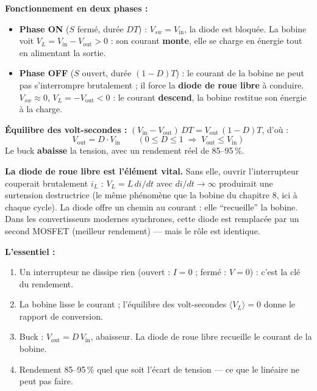 \documentclass[12pt,a4paper,twoside]{book}
\begin{document}
\begin{formule}
\textbf{Fonctionnement en deux phases :}
\begin{itemize}[nosep]
\item \textbf{Phase ON} ($S$ fermé, durée $DT$) : $V_{sw} = V_{\text{in}}$, la diode est bloquée. La bobine voit $V_L = V_{\text{in}} - V_{\text{out}} > 0$ : son courant \textbf{monte}, elle se charge en énergie tout en alimentant la sortie.
\item \textbf{Phase OFF} ($S$ ouvert, durée $(1-D)T$) : le courant de la bobine ne peut pas s'interrompre brutalement ; il force la \textbf{diode de roue libre} à conduire. $V_{sw} \approx 0$, $V_L = -V_{\text{out}} < 0$ : le courant \textbf{descend}, la bobine restitue son énergie à la charge.
\end{itemize}

\textbf{Équilibre des volt-secondes :} $(V_{\text{in}} - V_{\text{out}})\,DT = V_{\text{out}}\,(1-D)T$, d'où :
\[
\boxed{V_{\text{out}} = D \cdot V_{\text{in}} \qquad (0 \leq D \leq 1 \;\Rightarrow\; V_{\text{out}} \leq V_{\text{in}})}
\]
Le buck \textbf{abaisse} la tension, avec un rendement réel de 85--95\,\%.
\end{formule}

\begin{intuition}
\textbf{La diode de roue libre est l'élément vital.} Sans elle, ouvrir l'interrupteur couperait brutalement $i_L$ : $V_L = L\,di/dt$ avec $di/dt \to \infty$ produirait une surtension destructrice (le même phénomène que la bobine du chapitre 8, ici à chaque cycle). La diode offre un chemin au courant : elle ``recueille'' la bobine. Dans les convertisseurs modernes synchrones, cette diode est remplacée par un second MOSFET (meilleur rendement) --- mais le rôle est identique.
\end{intuition}

\begin{retenir}
\textbf{L'essentiel :}
\begin{enumerate}[nosep]
\item Un interrupteur ne dissipe rien (ouvert : $I=0$ ; fermé : $V=0$) : c'est la clé du rendement.
\item La bobine lisse le courant ; l'équilibre des volt-secondes $\langle V_L \rangle = 0$ donne le rapport de conversion.
\item Buck : $V_{\text{out}} = D\,V_{\text{in}}$, abaisseur. La diode de roue libre recueille le courant de la bobine.
\item Rendement 85--95\,\% quel que soit l'écart de tension --- ce que le linéaire ne peut pas faire.
\end{enumerate}
\end{retenir}
\end{document}
